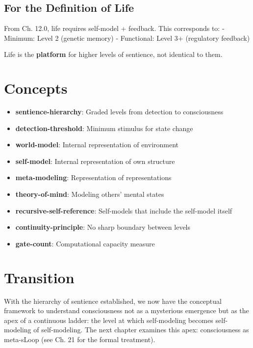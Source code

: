\documentclass[
  11pt,
  letterpaper,
  twoside,
  openright]{book}
\providecommand{\tightlist}{%
  \setlength{\itemsep}{0pt}\setlength{\parskip}{0pt}}
\begin{document}
\subsection{For the Definition of
Life}\label{for-the-definition-of-life}

From Ch. 12.0, life requires self-model + feedback. This corresponds to:
- Minimum: Level 2 (genetic memory) - Functional: Level 3+ (regulatory
feedback)

Life is the \textbf{platform} for higher levels of sentience, not
identical to them.

\section{Concepts}\label{concepts-38}

\begin{itemize}
\tightlist
\item
  \textbf{sentience-hierarchy}: Graded levels from detection to
  consciousness
\item
  \textbf{detection-threshold}: Minimum stimulus for state change
\item
  \textbf{world-model}: Internal representation of environment
\item
  \textbf{self-model}: Internal representation of own structure
\item
  \textbf{meta-modeling}: Representation of representations
\item
  \textbf{theory-of-mind}: Modeling others' mental states
\item
  \textbf{recursive-self-reference}: Self-models that include the
  self-model itself
\item
  \textbf{continuity-principle}: No sharp boundary between levels
\item
  \textbf{gate-count}: Computational capacity measure
\end{itemize}

\section{Transition}\label{transition-39}

With the hierarchy of sentience established, we now have the conceptual
framework to understand consciousness not as a mysterious emergence but
as the apex of a continuous ladder: the level at which self-modeling
becomes self-modeling of self-modeling. The next chapter examines this
apex: consciousness as meta-sLoop (see Ch. 21 for the formal treatment).
\end{document}
